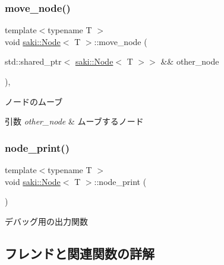 \subsubsection{\texorpdfstring{move\+\_\+node()}{move\_node()}}
{\footnotesize\ttfamily template$<$typename T $>$ \\
void \mbox{\hyperlink{classsaki_1_1_node}{saki\+::\+Node}}$<$ T $>$\+::move\+\_\+node (\begin{DoxyParamCaption}\item[{std\+::shared\+\_\+ptr$<$ \mbox{\hyperlink{classsaki_1_1_node}{saki\+::\+Node}}$<$ T $>$$>$ \&\&}]{other\+\_\+node }\end{DoxyParamCaption})\hspace{0.3cm}{\ttfamily [inline]}, {\ttfamily [noexcept]}}



ノードのムーブ 


\begin{DoxyParams}{引数}
{\em other\+\_\+node} & ムーブするノード \\
\hline
\end{DoxyParams}
\mbox{\label{classsaki_1_1_node_ac5b08cdb3fd3c60e38d849b7d18a9782}} 
\subsubsection{\texorpdfstring{node\+\_\+print()}{node\_print()}}
{\footnotesize\ttfamily template$<$typename T $>$ \\
void \mbox{\hyperlink{classsaki_1_1_node}{saki\+::\+Node}}$<$ T $>$\+::node\+\_\+print (\begin{DoxyParamCaption}{ }\end{DoxyParamCaption})\hspace{0.3cm}{\ttfamily [inline]}}



デバッグ用の出力関数 



\subsection{フレンドと関連関数の詳解}
\mbox{\label{classsaki_1_1_node_a151ca71f2c751d8a163f3f99ccf6cec9}} 
